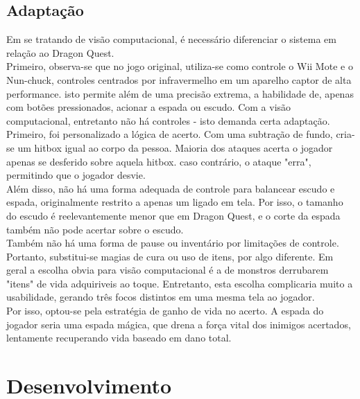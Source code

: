 \documentclass[12pt]{article}
\begin{document}
\subsection{Adaptação}
Em se tratando de visão computacional, é necessário diferenciar o sistema em relação ao Dragon Quest.
\\
Primeiro, observa-se que no jogo original, utiliza-se como controle o Wii Mote e o Nun-chuck, controles centrados por infravermelho em um aparelho captor de alta performance. isto permite além de uma precisão extrema, a habilidade de, apenas com botões pressionados, acionar a espada ou escudo.
Com a visão computacional, entretanto não há controles - isto demanda certa adaptação.
\\
Primeiro, foi personalizado a lógica de acerto. Com uma subtração de fundo, cria-se um hitbox igual ao corpo da pessoa. Maioria dos ataques acerta o jogador apenas se desferido sobre aquela hitbox. caso contrário, o ataque "erra", permitindo que o jogador desvie.
\\
Além disso, não há uma forma adequada de controle para balancear escudo e espada, originalmente restrito a apenas um ligado em tela. Por isso, o tamanho do escudo é reelevantemente menor que em Dragon Quest, e o corte da espada também não pode acertar sobre o escudo.
\\
Também não há uma forma de pause ou inventário por limitações de controle. Portanto, substitui-se magias de cura ou uso de itens, por algo diferente. Em geral a escolha obvia para visão computacional é a de monstros derrubarem "itens" de vida adquiriveis ao toque. Entretanto, esta escolha complicaria muito a usabilidade, gerando três focos distintos em uma mesma tela ao jogador.
\\
Por isso, optou-se pela estratégia de ganho de vida no acerto. A espada do jogador seria uma espada mágica, que drena a força vital dos inimigos acertados, lentamente recuperando vida baseado em dano total.
\\







\section{Desenvolvimento}
\end{document}
